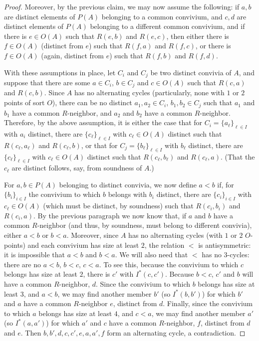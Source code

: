 \documentclass{amsart}
\theoremstyle{definition}
\theoremstyle{remark}
\numberwithin{equation}{section}
\begin{document}
\begin{proof}
Moreover, by the previous claim, we may now assume the following: if $a, b$ are distinct elements of $P(A)$ belonging to a common convivium, and $c, d$ are distinct elements of $P(A)$ belonging to a different common convivium, and if there is $e \in O(A) $ such that $R(e, b)$ and $R(e, c)$, then either there is $f \in O(A)$ (distinct from $e$) such that $R(f, a)$ and $R(f, c)$, or there is $f\in O(A)$ (again, distinct from $e$) such that $R(f, b)$ and $R(f, d)$.

With these assumptions in place, let $C_i$ and $C_j$ be two distinct convivia of $A$, and suppose that there are some $a \in C_i$, $b \in C_j$ and  $c \in O(A)$ such that $R(c, a)$ and $R(c, b)$.  Since $A$ has no alternating cycles (particularly, none with $1$ or $2$ points of sort $O$), there can be no distinct $a_1, a_2 \in C_i$, $b_1, b_2 \in C_j$ such that $a_1$ and $b_1$ have a common $R$-neighbor, and $a_2$ and $b_2$ have a common $R$-neighbor. Therefore, by the above assumption, it is either the case that for $C_i=\{a_\ell\}_{\ell \in I}$ with $a_i$ distinct, there are $\{c_\ell\}_{\ell \in I}$ with $c_\ell \in O(A)$ distinct such that $R(c_\ell, a_\ell)$ and $R(c_\ell, b)$, or that for $C_j=\{b_\ell\}_{\ell \in I}$ with $b_\ell$ distinct, there are $\{c_\ell\}_{\ell \in I}$ with $c_\ell \in O(A)$ distinct such that $R(c_\ell, b_\ell)$ and $R(c_\ell, a)$. (That the $c_{\ell}$ are distinct follows, say, from soundness of $A$.)


For $a, b \in P(A)$ belonging to distinct convivia, we now define $a < b$ if, for $\{b_i\}_{i \in I}$ the convivium to which $b$ belongs with $b_i$ distinct, there are $\{c_i \}_{i \in I}$ with $c_\ell \in O(A)$ (which must be distinct, by soundness) such that $R(c_i, b_i)$ and $R(c_i, a)$.  By the previous paragraph we now know that, if $a$ and $b$ have a common $R$-neighbor (and thus, by soundness, must belong to different convivia), either $a < b$ or $b < a$. Moreover, since $A$ has no alternating cycles (with $1$ or $2$ $O$-points) and each convivium has size at least $2$, the relation $<$ is antisymmetric: it is impossible that $a < b$ and $b < a$. We will also need that $<$ has no $3$-cycles: there are no $a < b$, $b < c$, $c < a$. To see this, because the convivium to which $c$ belongs has size at least $2$, there is $c'$ with $I^{*}(c, c')$. Because $b < c$, $c'$ and $b$ will have a common $R$-neighbor, $d$. Since the convivium to which $b$ belongs has size at least $3$, and $a < b$, we may find another member $b'$ (so $I^{*}(b, b')$) for which $b'$ and $a$ have a common $R$-neighbor $e$, distinct from $d$. Finally, since the convivium to which $a$ belongs has size at least $4$, and $c < a$, we may find another member $a'$ (so $I^{*}(a, a')$) for which $a'$ and $c$ have a common $R$-neighbor, $f$, distinct from $d$ and $e$. Then $b, b', d, c, c', e, a, a', f$ form an alternating cycle, a contradiction.



\end{proof}
\end{document}
